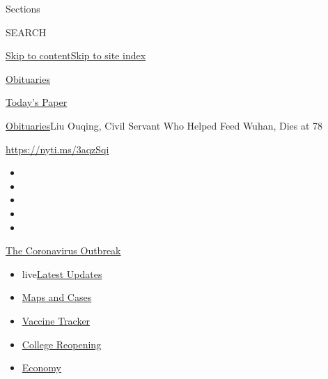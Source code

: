 Sections

SEARCH

\protect\hyperlink{site-content}{Skip to
content}\protect\hyperlink{site-index}{Skip to site index}

\href{https://www.nytimes.com/section/obituaries}{Obituaries}

\href{https://myaccount.nytimes.com/auth/login?response_type=cookie\&client_id=vi}{}

\href{https://www.nytimes.com/section/todayspaper}{Today's Paper}

\href{/section/obituaries}{Obituaries}\textbar{}Liu Ouqing, Civil
Servant Who Helped Feed Wuhan, Dies at 78

\url{https://nyti.ms/3aqzSqi}

\begin{itemize}
\item
\item
\item
\item
\item
\end{itemize}

\href{https://www.nytimes.com/news-event/coronavirus?action=click\&pgtype=Article\&state=default\&region=TOP_BANNER\&context=storylines_menu}{The
Coronavirus Outbreak}

\begin{itemize}
\tightlist
\item
  live\href{https://www.nytimes.com/2020/08/03/world/coronavirus-covid-19.html?action=click\&pgtype=Article\&state=default\&region=TOP_BANNER\&context=storylines_menu}{Latest
  Updates}
\item
  \href{https://www.nytimes.com/interactive/2020/us/coronavirus-us-cases.html?action=click\&pgtype=Article\&state=default\&region=TOP_BANNER\&context=storylines_menu}{Maps
  and Cases}
\item
  \href{https://www.nytimes.com/interactive/2020/science/coronavirus-vaccine-tracker.html?action=click\&pgtype=Article\&state=default\&region=TOP_BANNER\&context=storylines_menu}{Vaccine
  Tracker}
\item
  \href{https://www.nytimes.com/2020/08/02/us/covid-college-reopening.html?action=click\&pgtype=Article\&state=default\&region=TOP_BANNER\&context=storylines_menu}{College
  Reopening}
\item
  \href{https://www.nytimes.com/live/2020/08/03/business/stock-market-today-coronavirus?action=click\&pgtype=Article\&state=default\&region=TOP_BANNER\&context=storylines_menu}{Economy}
\end{itemize}

